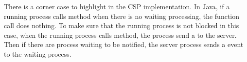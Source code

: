 \documentclass{article}
\begin{document}
There is a corner case to highlight in the CSP implementation. In Java, if a running process calls  method when there is no waiting processing, the function call does nothing. To make sure that the running process is not blocked in this case, when the running process calls  method, the process send a  to the server. Then if there are process waiting to be notified, the server process sends a  event to the waiting process.
\end{document}
